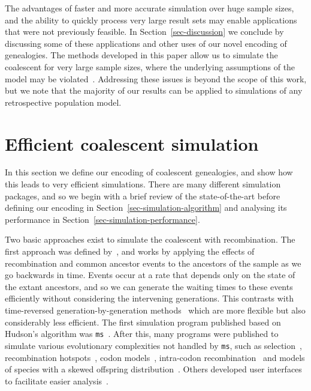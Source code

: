 \documentclass[10pt]{article}
\newcommand{\ms}[0]{\texttt{ms}}
\begin{document}
The advantages of faster and more accurate simulation over huge sample sizes,
and the ability to quickly process very large result sets may enable
applications that were not previously feasible. In Section~\ref{sec-discussion}
we conclude by discussing some of these applications and other uses of our
novel encoding of genealogies.
The methods developed in this paper allow us to simulate the coalescent for
very large sample sizes, where the underlying assumptions of the model
may be violated~\citep{wt03,bcs14}. Addressing these issues is beyond
the scope of this work, but we note that the majority of our results
can be applied to simulations of any retrospective population model.


\section{Efficient coalescent simulation}
\label{sec-simulation}

In this section we define our  encoding of coalescent genealogies, and
show how this leads to very efficient simulations. There are many different
simulation packages, and so we begin with a brief review of the state-of-the-art before
defining our encoding in Section~\ref{sec-simulation-algorithm} and
analysing its performance in Section~\ref{sec-simulation-performance}.

Two basic approaches exist to simulate the coalescent with recombination. The
first approach was defined by~\citet{h83b}, and works by applying the effects of
recombination and common ancestor events to the ancestors of the sample as we
go backwards in time. Events occur at a rate that depends only on the
state of the extant ancestors, and so we can generate the waiting times to
these events efficiently without considering the intervening generations.
This contrasts with time-reversed generation-by-generation
methods~\citep{ens00,le04,arch05,lza07} which are more flexible but
also considerably less efficient.
The first simulation program published based on Hudson's algorithm was
\ms~\citep{h02}. After this, many programs were  published to simulate various
evolutionary complexities not handled by \ms, such as
selection~\citep{sc04,ti09,eh10,sss14}, recombination hotspots~\citep{hs07},
codon models~\citep{ap07}, intra-codon recombination~\citep{ap10}
and models of species with a skewed offspring distribution~\citep{zdge15}. Others
developed user interfaces to facilitate easier analysis~\citep{mspmms05,rm07}.
\end{document}
